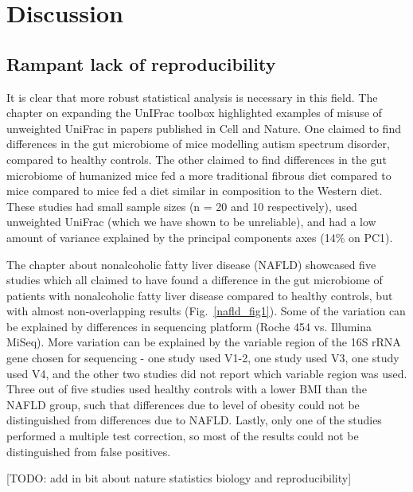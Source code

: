 \chapter{Discussion}

\section{Rampant lack of reproducibility}
It is clear that more robust statistical analysis is necessary in this field. The chapter on expanding the UnIFrac toolbox highlighted examples of misuse of unweighted UniFrac in papers published in Cell and Nature. One claimed to find differences in the gut microbiome of mice modelling autism spectrum disorder, compared to healthy controls. The other claimed to find differences in the gut microbiome of humanized mice fed a more traditional fibrous diet compared to mice compared to mice fed a diet similar in composition to the Western diet. These studies had small sample sizes (n = 20 and 10 respectively), used unweighted UniFrac (which we have shown to be unreliable), and had a low amount of variance explained by the principal components axes (14\% on PC1).

The chapter about nonalcoholic fatty liver disease (NAFLD) showcased five studies which all claimed to have found a difference in the gut microbiome of patients with nonalcoholic fatty liver disease compared to healthy controls, but with almost non-overlapping results (Fig.~\ref{nafld_fig1}). Some of the variation can be explained by differences in sequencing platform (Roche 454 vs. Illumina MiSeq). More variation can be explained by the variable region of the 16S rRNA gene chosen for sequencing - one study used V1-2, one study used V3, one study used V4, and the other two studies did not report which variable region was used. Three out of five studies used healthy controls with a lower BMI than the NAFLD group, such that differences due to level of obesity could not be distinguished from differences due to NAFLD. Lastly, only one of the studies performed a multiple test correction, so most of the results could not be distinguished from false positives.

[TODO: add in bit about nature statistics biology and reproducibility]

